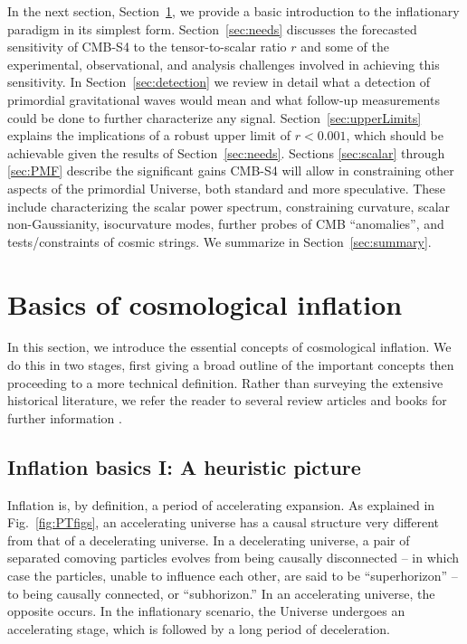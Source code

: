
In the next section, Section~\ref{sec:basics}, we provide a basic introduction to the inflationary paradigm in its simplest form. Section~\ref{sec:needs} discusses the forecasted sensitivity of CMB-S4 to the tensor-to-scalar ratio $r$ and some of the experimental, observational, and analysis challenges involved in achieving this sensitivity. In Section~\ref{sec:detection} we review in detail what a detection of primordial gravitational waves would mean and what follow-up measurements could be done to further characterize any signal. Section~\ref{sec:upperLimits} explains the implications of a robust upper limit of $r<0.001$, which should be achievable given the results of Section~\ref{sec:needs}. Sections \ref{sec:scalar} through \ref{sec:PMF} describe the significant gains CMB-S4 will allow in constraining other aspects of the primordial Universe, both standard and more speculative. These include characterizing the scalar power spectrum, constraining curvature, scalar non-Gaussianity, isocurvature modes, further probes of CMB ``anomalies'', and tests/constraints of cosmic strings. We summarize in Section~\ref{sec:summary}.
 


\section{Basics of cosmological inflation}
\label{sec:basics}

In this section, we introduce the essential concepts of cosmological inflation. We do this in two stages, first giving a broad outline of the important concepts then proceeding to a more technical definition.  Rather than surveying the extensive historical literature, we refer the reader to several review articles and books for further information
\cite{LythRiotto,LiddleLyth,Mukhanov:2005sc,Baumann:2009ds,Linde:2005dd,EllisWands}.

\subsection{Inflation basics I: A heuristic picture}

Inflation is, by definition, a period of accelerating expansion. As explained in Fig.~\ref{fig:PTfigs}, an accelerating universe has a causal structure very different from that of a decelerating universe. In a decelerating universe, a pair of separated comoving particles evolves from being causally disconnected -- in which case the particles, unable to influence each other, are said to be ``superhorizon'' -- to being causally connected, or ``subhorizon.'' In an accelerating universe, the opposite occurs. In the inflationary scenario, the Universe undergoes an accelerating stage, which is followed by a long period of deceleration.


